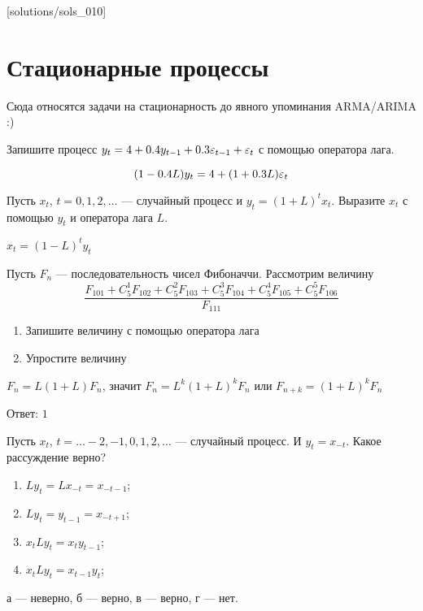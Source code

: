 
[solutions/sols_010]

\chapter{Стационарные процессы}

Сюда относятся задачи на стационарность до явного упоминания ARMA/ARIMA :)

\begin{problem}
Запишите процесс $y_t = 4 + 0.4y_{t-1} + 0.3\varepsilon_{t-1} + \varepsilon_t$ с помощью оператора лага.
\begin{sol}
\[
(1 - 0.4L)y_t = 4 + (1 + 0.3L)\varepsilon_t
\]
\end{sol}
\end{problem}


\begin{problem}
Пусть $x_{t}$, $t=0,1,2, \ldots$ — случайный процесс и $y_{t}=(1+L)^{t}x_{t}$.
Выразите $x_{t}$ с помощью $y_{t}$ и оператора лага $L$.

\begin{sol}
$x_{t}=(1-L)^{t}y_{t}$
\end{sol}
\end{problem}

\begin{problem}
Пусть $ F_{n} $ — последовательность чисел Фибоначчи. Рассмотрим величину
\[
\frac{F_{101}+C^{1}_{5}F_{102}+C^{2}_{5}F_{103}+C^{3}_{5}F_{104}+C^{4}_{5}F_{105}+C^{5}_{5}F_{106}}
{F_{111}}
\]
\begin{enumerate}
\item Запишите величину с помощью оператора лага
\item Упростите величину
\end{enumerate}

\begin{sol}
$ F_{n}=L(1+L)F_{n} $, значит $ F_{n}=L^{k}(1+L)^{k}F_{n} $ или $ F_{n+k}=(1+L)^{k}F_{n} $

Ответ: $1$
\end{sol}
\end{problem}




\begin{problem}
Пусть $x_{t}$, $t=\ldots -2,-1,0,1,2,\ldots $ — случайный процесс. И $y_{t}=x_{-t}$. Какое рассуждение верно?

\begin{enumerate}
\item $Ly_{t}=Lx_{-t}=x_{-t-1}$;
\item $Ly_{t}=y_{t-1}=x_{-t+1}$;
\item $x_t L y_t = x_t y_{t-1}$;
\item $x_t L y_t = x_{t-1} y_t$;
\end{enumerate}
\begin{sol}
а — неверно, б — верно, в — верно, г — нет.
\end{sol}
\end{problem}

